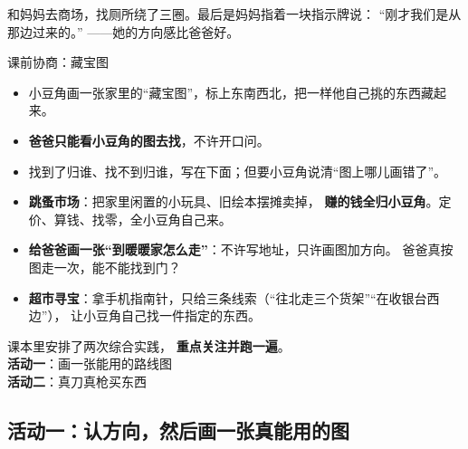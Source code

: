 ﻿%

\begin{blunder}
和妈妈去商场，找厕所绕了三圈。最后是妈妈指着一块指示牌说：
“刚才我们是从那边过来的。”
——她的方向感比爸爸好。
\end{blunder}

\begin{gamble}{课前协商：藏宝图}
\begin{itemize}
  \item 小豆角画一张家里的“藏宝图”，标上东南西北，把一样他自己挑的东西藏起来。
  \item \textbf{爸爸只能看小豆角的图去找}，不许开口问。
  \item 找到了归谁、找不到归谁，写在下面；但要小豆角说清“图上哪儿画错了”。
\end{itemize}
\negolines
\end{gamble}

\begin{bonus}
\begin{itemize}
  \item \textbf{跳蚤市场}：把家里闲置的小玩具、旧绘本摆摊卖掉，
        \textbf{赚的钱全归小豆角}。定价、算钱、找零，全小豆角自己来。
  \item \textbf{给爸爸画一张“到暖暖家怎么走”}：不许写地址，只许画图加方向。
        爸爸真按图走一次，能不能找到门？
  \item \textbf{超市寻宝}：拿手机指南针，只给三条线索（“往北走三个货架”“在收银台西边”），
        让小豆角自己找一件指定的东西。
\end{itemize}
\end{bonus}

\begin{unitinfo}
课本里安排了两次综合实践，
\textbf{重点关注并跑一遍}。\\
\textbf{活动一}：画一张能用的路线图\\
\textbf{活动二}：真刀真枪买东西
\end{unitinfo}

\subsection{活动一：认方向，然后画一张真能用的图}

